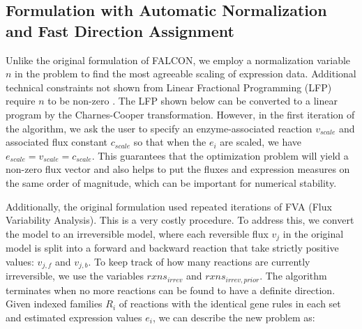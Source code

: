\begin{methods}
\subsection{Formulation with Automatic Normalization and Fast Direction Assignment}
Unlike the original formulation of FALCON, we employ a normalization variable $n$ in the problem
to find the most agreeable scaling of expression data. Additional technical constraints not shown
from Linear Fractional Programming (LFP) require $n$ to be non-zero \cite{Boyd2004}. The
LFP shown below can be converted to a linear program by the Charnes-Cooper transformation.
However, in the first iteration of the algorithm, we ask the user to
specify an enzyme-associated reaction $v_{scale}$ and associated flux
constant $c_{scale}$ so that when the $e_i$ are scaled, we have
$e_{scale} = v_{scale} = c_{scale}$. This guarantees that the
optimization problem will yield a non-zero flux vector and also helps
to put the fluxes and expression measures on the same order of
magnitude, which can be important for numerical stability.

Additionally, the original formulation
used repeated iterations of FVA (Flux Variability Analysis). This is a very costly procedure. 
To address this, we convert the model to an irreversible model, where each reversible flux $v_j$
in the original model is split into a forward and backward reaction that take strictly positive
values: $v_{j,f}$ and $v_{j,b}$. To keep track of how many reactions
are currently irreversible, we use the variables $rxns_{irrev}$ and
$rxns_{irrev,prior}$. The algorithm terminates when no more reactions
can be found to have a definite direction.  Given indexed families
$R_i$ of reactions with the identical gene rules in each set and
estimated expression values $e_i$, we can describe the new problem as:


\end{methods}
